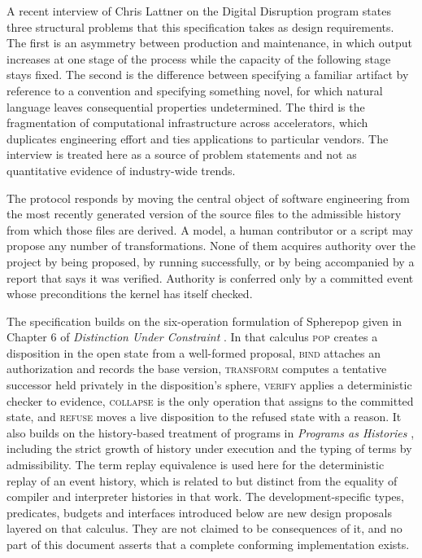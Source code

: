 \documentclass[11pt]{article}
\theoremstyle{remark}
\newcommand{\POP}{\textsc{pop}}
\newcommand{\REFUSE}{\textsc{refuse}}
\newcommand{\BIND}{\textsc{bind}}
\newcommand{\TRANSFORM}{\textsc{transform}}
\newcommand{\VERIFY}{\textsc{verify}}
\newcommand{\COLLAPSE}{\textsc{collapse}}
\begin{document}
A recent interview of Chris Lattner on the Digital Disruption program \cite{lattner-interview} states three structural problems that this specification takes as design requirements. The first is an asymmetry between production and maintenance, in which output increases at one stage of the process while the capacity of the following stage stays fixed. The second is the difference between specifying a familiar artifact by reference to a convention and specifying something novel, for which natural language leaves consequential properties undetermined. The third is the fragmentation of computational infrastructure across accelerators, which duplicates engineering effort and ties applications to particular vendors. The interview is treated here as a source of problem statements and not as quantitative evidence of industry-wide trends.

The protocol responds by moving the central object of software engineering from the most recently generated version of the source files to the admissible history from which those files are derived. A model, a human contributor or a script may propose any number of transformations. None of them acquires authority over the project by being proposed, by running successfully, or by being accompanied by a report that says it was verified. Authority is conferred only by a committed event whose preconditions the kernel has itself checked.

The specification builds on the six-operation formulation of Spherepop given in Chapter 6 of \emph{Distinction Under Constraint} \cite{duc}. In that calculus \POP{} creates a disposition in the open state from a well-formed proposal, \BIND{} attaches an authorization and records the base version, \TRANSFORM{} computes a tentative successor held privately in the disposition's sphere, \VERIFY{} applies a deterministic checker to evidence, \COLLAPSE{} is the only operation that assigns to the committed state, and \REFUSE{} moves a live disposition to the refused state with a reason. It also builds on the history-based treatment of programs in \emph{Programs as Histories} \cite{pah}, including the strict growth of history under execution and the typing of terms by admissibility. The term replay equivalence is used here for the deterministic replay of an event history, which is related to but distinct from the equality of compiler and interpreter histories in that work. The development-specific types, predicates, budgets and interfaces introduced below are new design proposals layered on that calculus. They are not claimed to be consequences of it, and no part of this document asserts that a complete conforming implementation exists.
\end{document}
